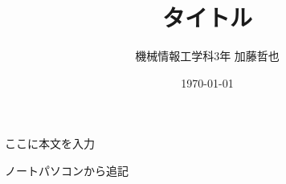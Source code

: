 \documentclass[paper=a4paper,fontsize=10pt]{jlreq}
\begin{document}
\title{タイトル}
\author{機械情報工学科3年 加藤哲也}
\date{\today}
\maketitle

\tableofcontents

ここに本文を入力

ノートパソコンから追記

\end{document}
